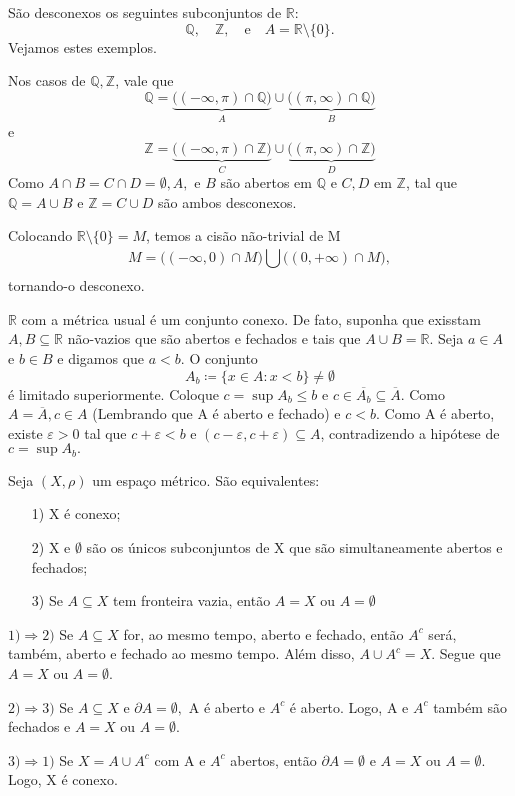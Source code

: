 \documentclass[metric_notes.tex]{subfiles}
\begin{document}
\begin{example}
	São desconexos os seguintes subconjuntos de \(\mathbb{R}\):
	\[
		\mathbb{Q}, \quad \mathbb{Z},\quad\text{e}\quad A = \mathbb{R}\setminus\{0\}.
	\]
	Vejamos estes exemplos.

	Nos casos de \(\mathbb{Q}, \mathbb{Z}\), vale que
	\[
		\mathbb{Q} = \underbrace{\biggl((-\infty, \pi )\cap \mathbb{Q}\biggr)}_{A}\cup \underbrace{\biggl((\pi , \infty)\cap \mathbb{Q}\biggr)}_{B}
	\]
	e
	\[
		\mathbb{Z} = \underbrace{\biggl((-\infty, \pi )\cap \mathbb{Z}\biggr)}_{C}\cup \underbrace{\biggl((\pi , \infty)\cap \mathbb{Z}\biggr)}_{D}
	\]
	Como \(A\cap B = C\cap D = \emptyset, A,\text{ e }B\) são abertos em \(\mathbb{Q}\) e \(C, D\) em \(\mathbb{Z}\), tal que \(\mathbb{Q} = A\cup B\)
	e \(\mathbb{Z} = C\cup D\) são ambos desconexos.

	Colocando \(\mathbb{R}\setminus\{0\} = M\), temos a cisão não-trivial de M
	\[
		M = \biggl((-\infty, 0)\cap M\biggr)\bigcup_{}^{}{\biggl((0, +\infty)\cap M\biggr)},
	\]
	tornando-o desconexo.

\end{example}
\begin{example}
	\(\mathbb{R}\) com a métrica usual é um conjunto conexo. De fato, suponha que exisstam
	\(A, B\subseteq{\mathbb{R}}\) não-vazios que são abertos e fechados e tais que \(A\cup B = \mathbb{R}\).
	Seja \(a\in A\) e \(b\in B\) e digamos que \(a < b\). O conjunto
	\[
		A_{b}\coloneqq \{x\in A: x < b\}\neq\emptyset
	\]
	é limitado superiormente. Coloque \(c = \sup A_{b}\leq b\) e \(c\in \overline{A_{b}}\subseteq{\overline{A}}.\)
	Como \(A = \overline{A}, c\in A\) (Lembrando que A é aberto e fechado) e \(c < b\). Como A é
	aberto, existe \(\varepsilon >0\) tal que \(c+\varepsilon < b\) e \((c-\varepsilon , c + \varepsilon )\subseteq{A}\),
	contradizendo a hipótese de \(c = \sup A_{b}.\)
\end{example}
\begin{prop*}
	Seja \((X, \rho )\) um espaço métrico. São equivalentes:
	\begin{itemize}
		\item[1)] X é conexo;
		\item[2)] X e \(\emptyset\) são os únicos subconjuntos de X que são simultaneamente
		      abertos e fechados;
		\item[3)] Se \(A\subseteq X\) tem fronteira vazia, então \(A = X\) ou \(A = \emptyset\)
	\end{itemize}
\end{prop*}
\begin{proof*}
	\(1) \Rightarrow 2)\) Se \(A \subseteq{X}\) for, ao mesmo tempo, aberto e fechado,
	então \(A^{c}\) será, também, aberto e fechado ao mesmo tempo. Além disso, \(A\cup A^{c} = X\).
	Segue que \(A = X\) ou \(A = \emptyset.\)

	\(2) \Rightarrow 3)\) Se \(A\subseteq{X}\) e \(\partial A = \emptyset,\) A é aberto e \(A^{c}\) é
	aberto. Logo, A e \(A^{c}\) também são fechados e \(A=X\) ou \(A=\emptyset\).

	\(3) \Rightarrow 1)\) Se \(X = A\cup A^{c}\) com A e \(A^{c}\) abertos, então \(\partial A = \emptyset\) e \(A = X\)
	ou \(A = \emptyset.\) Logo, X é conexo. \qedsymbol
\end{proof*}
\end{document}
